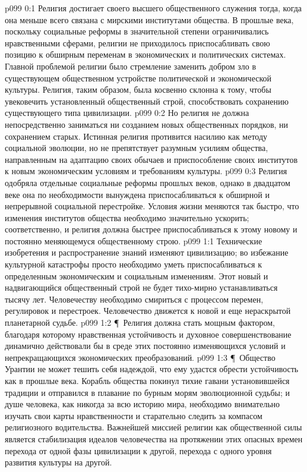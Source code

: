 \author{Мелхиседек}
\vs p099 0:1 Религия достигает своего высшего общественного служения тогда, когда она меньше всего связана с мирскими институтами общества. В прошлые века, поскольку социальные реформы в значительной степени ограничивались нравственными сферами, религии не приходилось приспосабливать свою позицию к обширным переменам в экономических и политических системах. Главной проблемой религии было стремление заменить добром зло в существующем общественном устройстве политической и экономической культуры. Религия, таким образом, была косвенно склонна к тому, чтобы увековечить установленный общественный строй, способствовать сохранению существующего типа цивилизации.
\vs p099 0:2 Но религия не должна непосредственно заниматься ни созданием новых общественных порядков, ни сохранением старых. Истинная религия противится насилию как методу социальной эволюции, но не препятствует разумным усилиям общества, направленным на адаптацию своих обычаев и приспособление своих институтов к новым экономическим условиям и требованиям культуры.
\vs p099 0:3 Религия одобряла отдельные социальные реформы прошлых веков, однако в двадцатом веке она по необходимости вынуждена приспосабливаться к обширной и непрерывной социальной перестройке. Условия жизни меняются так быстро, что изменения институтов общества необходимо значительно ускорить; соответственно, и религия должна быстрее приспосабливаться к этому новому и постоянно меняющемуся общественному строю.
\vs p099 1:1 Технические изобретения и распространение знаний изменяют цивилизацию; во избежание культурной катастрофы просто необходимо уметь приспосабливаться к определенным экономическим и социальным изменениям. Этот новый и надвигающийся общественный строй не будет тихо\hyp{}мирно устанавливаться тысячу лет. Человечеству необходимо смириться с процессом перемен, регулировок и перестроек. Человечество движется к новой и еще нераскрытой планетарной судьбе.
\vs p099 1:2 \P\ Религия должна стать мощным фактором, благодаря которому нравственная устойчивость и духовное совершенствование динамично действовали бы в среде этих постоянно изменяющихся условий и непрекращающихся экономических преобразований.
\vs p099 1:3 \P\ Общество Урантии не может тешить себя надеждой, что ему удастся обрести устойчивость как в прошлые века. Корабль общества покинул тихие гавани установившейся традиции и отправился в плавание по бурным морям эволюционной судьбы; и душе человека, как никогда за всю историю мира, необходимо внимательно изучать свои карты нравственности и старательно следить за компасом религиозного водительства. Важнейшей миссией религии как общественной силы является стабилизация идеалов человечества на протяжении этих опасных времен перехода от одной фазы цивилизации к другой, перехода с одного уровня развития культуры на другой.
